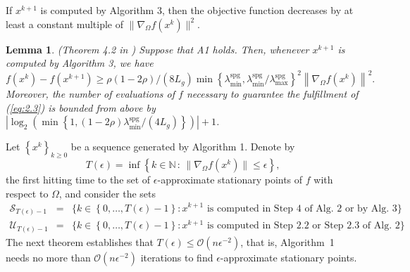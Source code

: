 \documentclass[11pt]{article}
\newtheorem{lemma}[theorem]{Lemma}
\begin{document}
If $x^{k+1}$ is computed by Algorithm 3, then the objective function decreases by at least a constant multiple of $\|\nabla_{\Omega} f(x^{k})\|^{2}$.

\begin{lemma}
\label{lem:2.2} (Theorem 4.2 in \cite{bmcomper}) Suppose that A1 holds. Then, whenever $x^{k+1}$ is computed by Algorithm 3, we have
\[
f(x^{k})-f(x^{k+1})\geq \rho(1-2\rho) / (8L_{g}) \min\left\{\lambda_{\min}^{\mathrm{spg}}, \lambda_{\min}^{\mathrm{spg}} / \lambda_{\max}^{\mathrm{spg}} \right\}^{2}\left\|\nabla_{\Omega} f(x^{k})\right\|^{2}.
\]
Moreover, the number of evaluations of $f$ necessary to guarantee the fulfillment of (\ref{eq:2.3}) is bounded from above by $\left|\log_{2}\left(\min\left\{1,(1-2\rho)\lambda_{\min}^{\mathrm{spg}}/(4L_{g})\right\}\right)\right|+1$.
\end{lemma}

Let $\left\{x^{k}\right\}_{k\geq 0}$ be a sequence generated by Algorithm 1. Denote by
\begin{equation}
    T(\epsilon)=\inf\left\{k\in\mathbb{N}\,:\,\|\nabla_{\Omega} f(x^{k})\|\leq\epsilon\right\},
    \label{eq:hitting}
\end{equation}
the first hitting time to the set of $\epsilon$-approximate stationary points of $f$ with respect to $\Omega$, and consider the sets 
\small
\begin{eqnarray*}
\mathcal{S}_{T(\epsilon)-1} &=& \{ k\in\left\{0,\dots,T(\epsilon)-1\right\}: \text{$x^{k+1}$ is computed in Step 4 of Alg. 2 or by Alg. 3}\}\\
\mathcal{U}_{T(\epsilon)-1} &=& \{k\in\left\{0,\dots,T(\epsilon)-1\right\} : \text{$x^{k+1}$ is computed in Step 2.2 or Step 2.3 of Alg. 2}\}
\end{eqnarray*} 
\normalsize
The next theorem establishes that $T(\epsilon) \leq \mathcal{O}\left(n\epsilon^{-2}\right)$, that is, Algorithm~1 needs no more than $\mathcal{O}(n\epsilon^{-2})$ iterations to find $\epsilon$-approximate stationary points.
\end{document}
